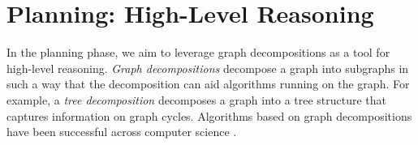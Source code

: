  









\section{Planning: High-Level Reasoning}
In the planning phase, we aim to leverage graph decompositions as a tool for high-level reasoning. \emph{Graph decompositions} \cite{halin1976s,robertson1984graph,RS91,ST94} decompose a graph into subgraphs in such a way that the decomposition can aid algorithms running on the graph.
For example, a \emph{tree decomposition} \cite{halin1976s,robertson1984graph} decomposes a graph into a tree structure that captures information on graph cycles.
Algorithms based on graph decompositions have been successful across computer science \cite{MPPV04,applegate2011traveling,cygan2015parameterized,GLST17}.

